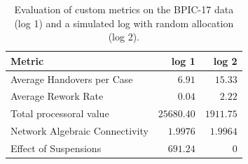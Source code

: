 \begin{table}[!h]
    \caption{Evaluation of custom metrics on the BPIC-17 data (log 1) and a simulated log with random allocation (log 2).}
    \centering
    \begin{tabular}{lrr}
        \textbf{Metric} & log 1 & log 2\\
        \hline
        Average Handovers per Case      & $6.91$ & $15.33$ \\
        Average Rework Rate             & $0.04$ & $2.22$\\
        Total processoral value         & $25680.40$ & $1911.75$ \\
        Network Algebraic Connectivity  & $1.9976$ & $1.9964$ \\
        Effect of Suspensions            & $691.24$ & $0$\\
    \end{tabular}
\end{table}
